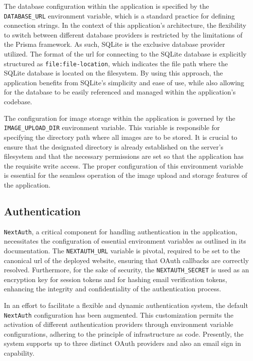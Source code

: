 The database configuration within the application is specified by the \texttt{DATABASE\_URL} environment variable, which is a standard practice for defining connection strings. In the context of this application's architecture, the flexibility to switch between different database providers is restricted by the limitations of the Prisma framework.\cite{prisma-sqlite} As such, SQLite is the exclusive database provider utilized. The format of the \acrshort{url} for connecting to the SQLite database is explicitly structured as \texttt{file:file-location}, which indicates the file path where the SQLite database is located on the filesystem. By using this approach, the application benefits from SQLite's simplicity and ease of use, while also allowing for the database to be easily referenced and managed within the application's codebase.

The configuration for image storage within the application is governed by the \texttt{IMAGE\_UPLOAD\_DIR} environment variable. This variable is responsible for specifying the directory path where all images are to be stored. It is crucial to ensure that the designated directory is already established on the server's filesystem and that the necessary permissions are set so that the application has the requisite write access. The proper configuration of this environment variable is essential for the seamless operation of the image upload and storage features of the application.

\subsection{Authentication}
\label{sec:authentication}

\texttt{NextAuth}, a critical component for handling authentication in the application, necessitates the configuration of essential environment variables as outlined in its documentation\cite{auth-options}. The \texttt{NEXTAUTH\_URL} variable is pivotal, required to be set to the canonical \acrshort{url} of the deployed website, ensuring that OAuth callbacks are correctly resolved. Furthermore, for the sake of security, the \texttt{NEXTAUTH\_SECRET} is used as an encryption key for session tokens and for hashing email verification tokens, enhancing the integrity and confidentiality of the authentication process.

In an effort to facilitate a flexible and dynamic authentication system, the default \texttt{NextAuth} configuration has been augmented. This customization permits the activation of different authentication providers through environment variable configurations, adhering to the principle of infrastructure as code. Presently, the system supports up to three distinct OAuth providers and also an email sign in capability.

